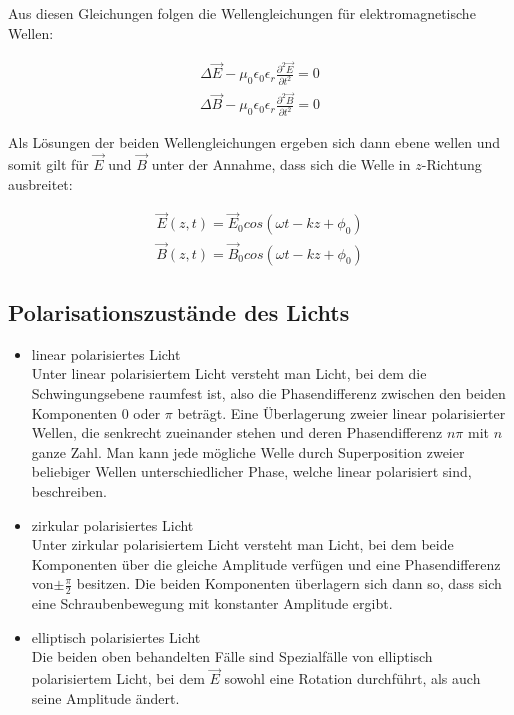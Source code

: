 \documentclass[a4paper,10pt]{scrartcl}
\begin{document}
			Aus diesen Gleichungen folgen die Wellengleichungen für elektromagnetische Wellen:
			
			\begin{align}
			\Delta\vec{E}-\mu_{0}\epsilon_{0}\epsilon_{r}\frac{\partial^{2}\vec{E}}{\partial t^{2}}=0 
			\end{align}
			\begin{align}
			\Delta\vec{B}-\mu_{0}\epsilon_{0}\epsilon_{r}\frac{\partial^{2}\vec{B}}{\partial t^{2}}=0
			\end{align}
			
			\newpage
			
			Als Lösungen der beiden Wellengleichungen ergeben sich dann ebene wellen und somit gilt für \(\vec{E}\) und \(\vec{B}\) unter der Annahme, dass sich die Welle in \(z\)-Richtung ausbreitet:
			
			\begin{align}
			\vec{E}(z,t)=\vec{E}_{0}cos(\omega t-kz+\phi_{0})
			\end{align}
			\begin{align}
			\vec{B}(z,t)=\vec{B}_{0}cos(\omega t-kz+\phi_{0})
			\end{align}
			
		\subsection{Polarisationszustände des Lichts}
			\begin{itemize}
				\item linear polarisiertes Licht\\
				Unter linear polarisiertem Licht versteht man Licht, bei dem die Schwingungsebene raumfest ist, also die Phasendifferenz zwischen den beiden Komponenten \(0\) oder \(\pi\) beträgt. Eine Überlagerung zweier linear polarisierter Wellen, die senkrecht zueinander stehen und deren Phasendifferenz \(n\pi\) mit \(n\) ganze Zahl. Man kann jede mögliche Welle durch Superposition zweier beliebiger Wellen unterschiedlicher Phase, welche linear polarisiert sind, beschreiben.
				\item zirkular polarisiertes Licht\\
				Unter zirkular polarisiertem Licht versteht man Licht, bei dem beide Komponenten über die gleiche Amplitude verfügen und eine Phasendifferenz von\(\pm \frac{\pi}{2}\) besitzen. Die beiden Komponenten überlagern sich dann so, dass sich eine Schraubenbewegung mit konstanter Amplitude ergibt.
				\item elliptisch polarisiertes Licht\\
				Die beiden oben behandelten Fälle sind Spezialfälle von elliptisch polarisiertem Licht, bei dem \(\vec{E}\) sowohl eine Rotation durchführt, als auch seine Amplitude ändert.
			\end{itemize}
			
\end{document}
